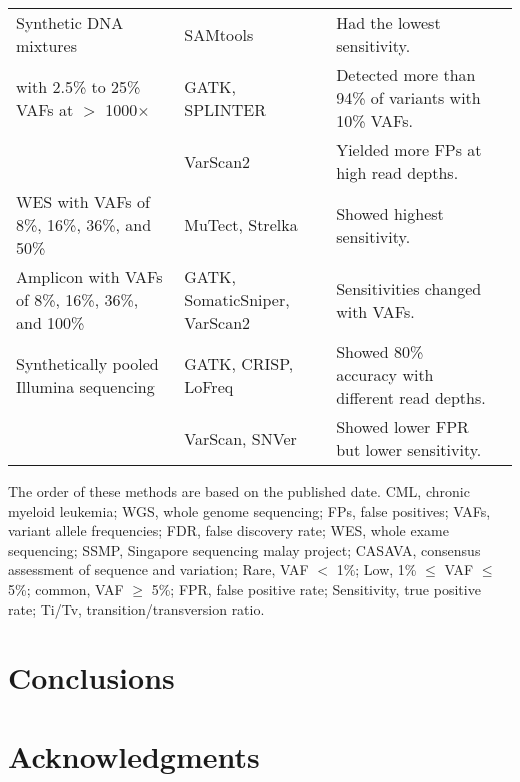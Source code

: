 \documentclass[11pt,reqno]{amsart}
\begin{document}
\begin{landscape}
\begin{table}[htbp]
\begin{threeparttable}
\begin{tabular}{rlrr}
    \midrule
    \multicolumn{1}{l}{Synthetic DNA mixtures } & SAMtools & \multicolumn{1}{l}{Had the lowest sensitivity.} &  \citealt{Spencer2014}\\
    \multicolumn{1}{l}{with 2.5\% to 25\% VAFs at $>$ 1000$\times$ } & GATK,  SPLINTER & \multicolumn{1}{l}{Detected more than 94\% of variants with 10\% VAFs.} &  \\
          & VarScan2 & \multicolumn{1}{l}{Yielded more FPs at high read depths.} &  \\

    \midrule
    \multicolumn{1}{l}{WES with VAFs of 8\%, 16\%, 36\%, and 50\%} & MuTect, Strelka & \multicolumn{1}{l}{Showed highest sensitivity.} &  \citealt{Xu2014}\\
    \multicolumn{1}{l}{Amplicon with VAFs of 8\%, 16\%, 36\%, and 100\%} & GATK, SomaticSniper, VarScan2 & \multicolumn{1}{l}{Sensitivities changed with VAFs.} &  \\

    \midrule
    \multicolumn{1}{l}{Synthetically pooled Illumina sequencing} & GATK, CRISP, LoFreq & \multicolumn{1}{l}{Showed 80\% accuracy with different read depths.} & \citealt{Huang2015} \\
          & VarScan, SNVer  & \multicolumn{1}{l}{Showed lower FPR but lower sensitivity.} &  \\

    \bottomrule
    \end{tabular}
   \begin{tablenotes}
	\item The order of these methods are based on the published date.
CML, chronic myeloid leukemia;
WGS, whole genome sequencing;
FPs, false positives;
VAFs, variant allele frequencies;
FDR, false discovery rate;
WES, whole exame sequencing;
SSMP, Singapore sequencing malay project;
CASAVA, consensus assessment of sequence and variation;
Rare, VAF $<$ 1\%; Low, 1\% $\leqslant$ VAF $\leqslant$  5\%; common, VAF $\geqslant$ 5\%;
FPR, false positive rate;
Sensitivity, true positive rate;
Ti/Tv, transition/transversion ratio.
    \end{tablenotes}
\end{threeparttable}
\end{table}
\end{landscape}




\section{Conclusions}


\section{Acknowledgments}





\end{document}
